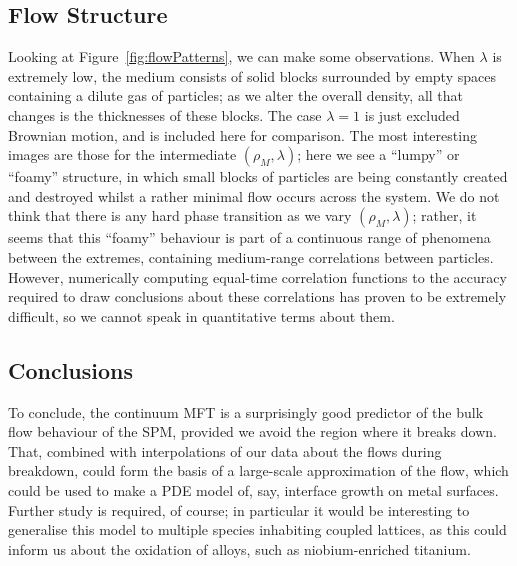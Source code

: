 \subsection{Flow Structure}
Looking at Figure~\ref{fig:flowPatterns}, we can make some observations. When $\lambda$ is extremely low, the medium consists of solid blocks surrounded by empty spaces containing a dilute gas of particles; as we alter the overall density,
all that changes is the thicknesses of these blocks. The case $\lambda=1$ is just excluded Brownian motion, and is included here for comparison. The most interesting images are those for the intermediate $(\rho_M , \lambda)$; here
we see a ``lumpy'' or ``foamy'' structure, in which small blocks of particles are being constantly created and destroyed whilst a rather minimal flow occurs across the system.
We do not think that there is any hard phase transition as we vary $(\rho_M , \lambda)$; rather, it seems that this ``foamy'' behaviour is part of a continuous range of phenomena between the extremes, containing medium-range correlations between
particles. However, numerically computing equal-time correlation functions to the accuracy required to draw conclusions about these correlations has proven to be extremely difficult, so we cannot speak in quantitative terms about them.
\subsection{Conclusions}
To conclude, the continuum MFT is a surprisingly good predictor of the bulk flow behaviour of the SPM, provided we avoid the region where it breaks down. That, combined with interpolations of our data about the flows during breakdown,
could form the basis of a large-scale approximation of the flow, which could be used to make a PDE model of, say, interface growth on metal surfaces. Further study is required, of course; in particular it would be interesting to generalise this
model to multiple species inhabiting coupled lattices, as this could inform us about the oxidation of alloys, such as niobium-enriched titanium.